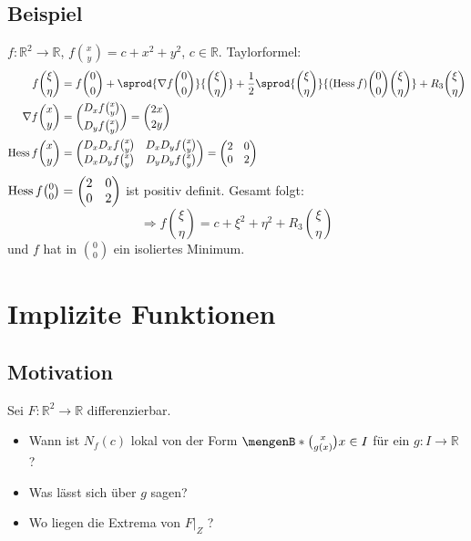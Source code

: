 
\subsection{Beispiel} %
\label{sub:720}
$f : \mathds{R}^2 \to \mathds{R}$, $f \binom{x}{y} = c+x^2 +y^2$, $c \in \mathds{R}$. Taylorformel:
\begin{align*}
	f \binom{\xi}{\eta} &= f \binom{0}{0} + \sprod{\nabla f \binom{0}{0}}{\binom{\xi}{\eta}} + \frac{1}{2} \sprod{\binom{\xi}{\eta}}{(\hess f) \binom{0}{0} \binom{\xi}{\eta}} + R_3
	\binom{\xi}{\eta}  \\
	\nabla f \binom{x}{y} &= \binom{D_x f \binom{x}{y}}{D_y f \binom{x}{y}} = \binom{2x}{2y} \\
	\hess f \binom{x}{y} &= \begin{pmatrix}
		D_x D_x f \binom{x}{y} & D_x D_y f \binom{x}{y} \\
		D_x D_y f \binom{x}{y} & D_y D_y f \binom{x}{y}
	\end{pmatrix} = \begin{pmatrix}
		2 & 0 \\
		0 & 2
	\end{pmatrix}
\end{align*}
$\operatorname{Hess} f \binom{0}{0} = \begin{pmatrix}
		2 & 0 \\
		0 & 2
\end{pmatrix}$ ist positiv definit. Gesamt folgt:
\[
	\Rightarrow f \binom{\xi}{\eta} = c +  \xi^2 +  \eta^2 + R_3 \binom{\xi}{\eta}	
\]
und $f$ hat in $\binom{0}{0}$ ein isoliertes Minimum.
\newpage
\section{Implizite Funktionen} %
\label{sec:8}
\subsection{Motivation} %
\label{sub:81}
Sei $F : \mathds{R}^2 \to \mathds{R}$ differenzierbar.
\begin{figure}[h]
\end{figure}
\begin{itemize}[*]
	\item Wann ist $N_f(c)$ lokal von der Form $\set[\binom{x}{g(x)}]{x \in I} $ für ein $g : I \to \mathds{R}$ ?
	\item Was lässt sich über $g$ sagen?
	\item Wo liegen die Extrema von $F|_Z$ ?
\end{itemize}

